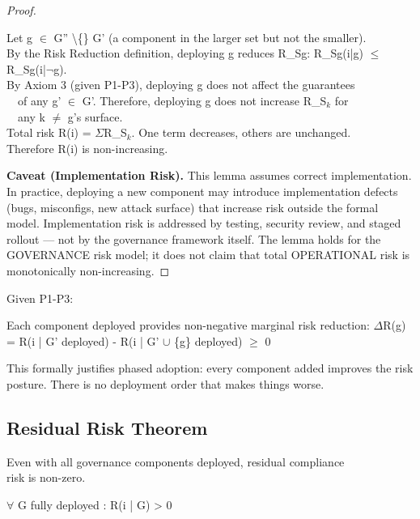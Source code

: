 \begin{proof}
\begin{claddisp}
Let g $\in$ G'' \textbackslash\{\} G' (a component in the larger set but not the smaller).\\
By the Risk Reduction definition, deploying g reduces R\_Sg: R\_Sg(i|g) $\leq$ R\_Sg(i|$\neg$g).\\
By Axiom 3 (given P1-P3), deploying g does not affect the guarantees\\
~~of any g' $\in$ G'. Therefore, deploying g does not increase R\_S$_k$ for\\
~~any k $\neq$ g's surface.\\
Total risk R(i) = $\Sigma$R\_S$_k$. One term decreases, others are unchanged.\\
Therefore R(i) is non-increasing.\\
\end{claddisp}
\smallskip\noindent\textbf{Caveat (Implementation Risk).}
This lemma assumes correct implementation. In practice, deploying a new component may introduce implementation defects (bugs, misconfigs, new attack surface) that increase risk outside the formal model.
Implementation risk is addressed by testing, security review, and staged rollout --- not by the governance framework itself.
The lemma holds for the GOVERNANCE risk model; it does not claim that total OPERATIONAL risk is monotonically non-increasing.

\end{proof}

\begin{ccor}
\begin{claddisp}
Given P1-P3:\\
\end{claddisp}
Each component deployed provides non-negative marginal risk reduction: $\Delta$R(g) = R(i | G' deployed) - R(i | G' $\cup$ \{g\} deployed) $\geq$ 0

This formally justifies phased adoption: every component added improves the risk posture. There is no deployment order that makes things worse.

\end{ccor}




\subsection{Residual Risk Theorem}


\begin{cthm}
\begin{claddisp}
Even with all governance components deployed, residual compliance\\
risk is non-zero.\\
\end{claddisp}
\begin{claddisp}
$\forall$ G fully deployed : R(i | G) > 0\\
\end{claddisp}
\end{cthm}

